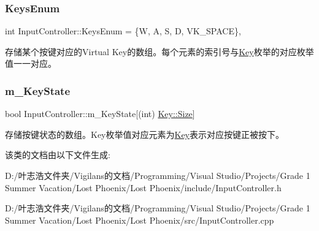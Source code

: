\subsubsection{\texorpdfstring{Keys\+Enum}{KeysEnum}}
{\footnotesize\ttfamily int Input\+Controller\+::\+Keys\+Enum = \{\textquotesingle{}W\textquotesingle{}, \textquotesingle{}A\textquotesingle{}, \textquotesingle{}S\textquotesingle{}, \textquotesingle{}D\textquotesingle{}, V\+K\+\_\+\+S\+P\+A\+CE\}\hspace{0.3cm}{\ttfamily [static]}, {\ttfamily [private]}}



存储某个按键对应的\+Virtual Key的数组。每个元素的索引号与\hyperlink{class_input_controller_a840a7425e2220e1ef5659a7ea4ba122d}{Key}枚举的对应枚举值一一对应。 

\mbox{\label{class_input_controller_aebe382d8d20e579a3f2c92b58ad53ac3}} 
\subsubsection{\texorpdfstring{m\+\_\+\+Key\+State}{m\_KeyState}}
{\footnotesize\ttfamily bool Input\+Controller\+::m\+\_\+\+Key\+State\mbox{[}(int) \hyperlink{class_input_controller_a840a7425e2220e1ef5659a7ea4ba122da6f6cb72d544962fa333e2e34ce64f719}{Key\+::\+Size}\mbox{]}\hspace{0.3cm}{\ttfamily [private]}}



存储按键状态的数组。\+Key枚举值对应元素为\hyperlink{class_input_controller_a840a7425e2220e1ef5659a7ea4ba122d}{Key}表示对应按键正被按下。 



该类的文档由以下文件生成\+:\begin{DoxyCompactItemize}
\item 
D\+:/叶志浩文件夹/\+Vigilans的文档/\+Programming/\+Visual Studio/\+Projects/\+Grade 1 Summer Vacation/\+Lost Phoenix/\+Lost Phoenix/include/Input\+Controller.\+h\item 
D\+:/叶志浩文件夹/\+Vigilans的文档/\+Programming/\+Visual Studio/\+Projects/\+Grade 1 Summer Vacation/\+Lost Phoenix/\+Lost Phoenix/src/Input\+Controller.\+cpp\end{DoxyCompactItemize}
